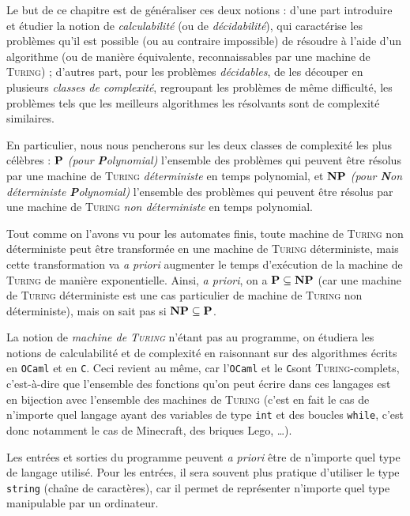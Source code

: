 \documentclass[a4paper,french,bookmarks]{book}
\newcommand{\langOcaml}{\texttt{\color{ocamlColor!20!black}OCaml}}
\newcommand{\langC}{\texttt{\color{ocamlColor!20!black}C}}
\newcommand{\cP}{\bbP}
\newcommand{\cNP}{\bbN\bbP}
\newcommand{\chaptertoc}[0]{
    \begin{tcolorbox}[
        enhanced,
        frame hidden,
        sharp corners,
        detach title,
        spread outwards     = 5pt,
        halign              = center,
        valign              = center,
        borderline west     = {3pt}{0pt}{main20!50!main2!95!gray!90},
        coltitle            = main20!50!main2!95!gray!90, 
        interior style      = {
            left color      = main1white2!65!gray!11,
            middle color    = main1white2!50!gray!10,
            right color     = main1white2!35!gray!9
        },
        arc                 = 0 cm,
        title               = SOMMAIRE,
        boxrule             = 0pt,
        fonttitle           = \bfseries\sffamily,
        overlay             = {
            \node[rotate=90, minimum width=1cm, anchor=south,yshift=-0.8cm]
            at (frame.west) {\tcbtitle};
        }
    ]
        \begin{minipage}{0.83\linewidth}
            \sffamily
            \minitoc
        \end{minipage}
    \end{tcolorbox}
}
\begin{document}
    Le but de ce chapitre est de généraliser ces deux notions : d'une part introduire et étudier la notion de \emph{calculabilité} (ou de \emph{décidabilité}), qui caractérise les problèmes qu'il est possible (ou au contraire impossible) de résoudre à l'aide d'un algorithme (ou de manière équivalente, reconnaissables par une machine de \textsc{Turing}) ; d'autres part, pour les problèmes \emph{décidables}, de les découper en plusieurs \emph{classes de complexité}, regroupant les problèmes de même difficulté, \ie les problèmes tels que les meilleurs algorithmes les résolvants sont de complexité similaires.\medskip
    
    En particulier, nous nous pencherons sur les deux classes de complexité les plus célèbres 
    : $\cP$ \emph{(pour \textsf{\textbf{P}olynomial})} l'ensemble des problèmes qui peuvent être résolus par une machine de \textsc{Turing} \emph{déterministe} en temps polynomial, et $\cNP$ \emph{(pour \textsf{\textbf{N}on déterministe \textbf{P}olynomial)}} l'ensemble des problèmes qui peuvent être résolus par une machine de \textsc{Turing} \emph{non déterministe} en temps polynomial.\medskip 

    Tout comme on l'avons vu pour les automates finis, toute machine de \textsc{Turing} non déterministe peut être transformée en une machine de \textsc{Turing} déterministe, mais cette transformation va \textit{\large\EBGaramond a priori} augmenter le temps d'exécution de la machine de \textsc{Turing} de manière exponentielle. Ainsi, \textit{\large\EBGaramond a priori}, on a $\cP \subseteq \cNP$ (car une machine de \textsc{Turing} déterministe est une cas particulier de machine de \textsc{Turing} non déterministe), mais on sait pas si $\cNP \subseteq \cP$.\bigskip
    
    \chaptertoc
    
    La notion de \emph{machine de \textsc{Turing}} n'étant pas au programme, on étudiera les notions de calculabilité et de complexité en raisonnant sur des algorithmes écrits en \langOcaml{} et en \langC. Ceci revient au même, car l'\langOcaml{} et le \langC sont \textsc{Turing}-complets, c'est-à-dire que l'ensemble des fonctions qu'on peut écrire dans ces langages est en bijection avec l'ensemble des machines de \textsc{Turing} (c'est en fait le cas de n'importe quel langage ayant des variables de type \texttt{int} et des boucles \texttt{while}, c'est donc notamment le cas de Minecraft\texttrademark, des briques Lego\texttrademark, \dots).\medskip
    
    Les entrées et sorties du programme peuvent \textit{\large\EBGaramond a priori} être de n'importe quel type de langage utilisé.
    Pour les entrées, il sera souvent plus pratique d'utiliser le type \texttt{string} (chaîne de caractères), car il permet de représenter n'importe quel type manipulable par un ordinateur.
    
\end{document}
